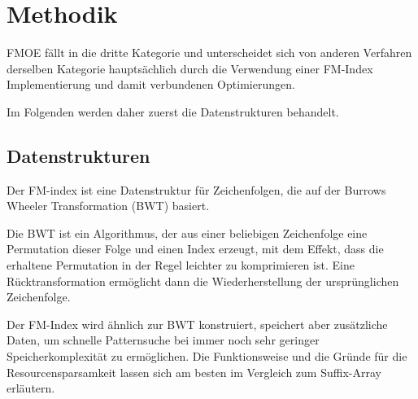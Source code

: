 \chapter{Methodik}
\label{ch:methodik}

FMOE fällt in die dritte Kategorie und unterscheidet sich von anderen Verfahren derselben Kategorie hauptsächlich durch die Verwendung einer FM-Index Implementierung \cite{FmIndexImpl} und damit verbundenen Optimierungen.

Im Folgenden werden daher zuerst die Datenstrukturen behandelt.

\section{Datenstrukturen}
\label{sec:datenstrukturen}

Der FM-index \cite{FmIndex} \cite{FmIndexUsage} ist eine Datenstruktur für Zeichenfolgen, die auf der Burrows Wheeler Transformation \cite{BurrowsWheeler} (BWT) basiert.

Die BWT ist ein Algorithmus, der aus einer beliebigen Zeichenfolge eine Permutation dieser Folge und einen Index erzeugt, mit dem Effekt, dass die erhaltene Permutation in der Regel leichter zu komprimieren ist.
Eine Rücktransformation ermöglicht dann die Wiederherstellung der ursprünglichen Zeichenfolge.

Der FM-Index wird ähnlich zur BWT konstruiert, speichert aber zusätzliche Daten, um schnelle Patternsuche bei immer noch sehr geringer Speicherkomplexität zu ermöglichen.
Die Funktionsweise und die Gründe für die Resourcensparsamkeit lassen sich am besten im Vergleich zum Suffix-Array erläutern.

